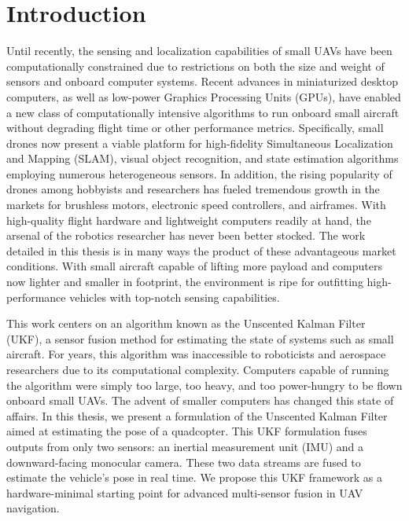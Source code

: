 \chapter{Introduction}


Until recently, the sensing and localization capabilities of small UAVs have been computationally constrained due to restrictions on both the size and weight of sensors and onboard computer systems. Recent advances in miniaturized desktop computers, as well as low-power Graphics Processing Units (GPUs), have enabled a new class of computationally intensive algorithms to run onboard small aircraft without degrading flight time or other performance metrics. Specifically, small drones now present a viable platform for high-fidelity Simultaneous Localization and Mapping (SLAM), visual object recognition, and state estimation algorithms employing numerous heterogeneous sensors. In addition, the rising popularity of drones among hobbyists and researchers has fueled tremendous growth in the markets for brushless motors, electronic speed controllers, and airframes. With high-quality flight hardware and lightweight computers readily at hand, the arsenal of the robotics researcher has never been better stocked. The work detailed in this thesis is in many ways the product of these advantageous market conditions. With small aircraft capable of lifting more payload and computers now lighter and smaller in footprint, the environment is ripe for outfitting high-performance vehicles with top-notch sensing capabilities.

This work centers on an algorithm known as the Unscented Kalman Filter (UKF), a sensor fusion method for estimating the state of systems such as small aircraft. For years, this algorithm was inaccessible to roboticists and aerospace researchers due to its computational complexity. Computers capable of running the algorithm were simply too large, too heavy, and too power-hungry to be flown onboard small UAVs. The advent of smaller computers has changed this state of affairs. In this thesis, we present a formulation of the Unscented Kalman Filter aimed at estimating the pose of a quadcopter. This UKF formulation fuses outputs from only two sensors: an inertial measurement unit (IMU) and a downward-facing monocular camera. These two data streams are fused to estimate the vehicle's pose in real time. We propose this UKF framework as a hardware-minimal starting point for advanced multi-sensor fusion in UAV navigation.

